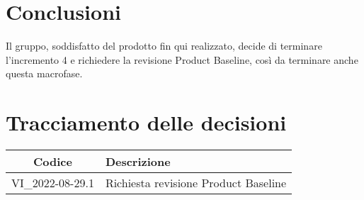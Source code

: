 \section{Conclusioni}
Il gruppo, soddisfatto del prodotto fin qui realizzato, decide di terminare l'incremento 4 e richiedere la revisione Product Baseline, così da terminare anche questa macrofase.
\newpage

\section*{Tracciamento delle decisioni}
	\renewcommand{\arraystretch}{1.8} %
	\begin{tabular}{ |c|l| }
		\hline
		\textbf{Codice} & \textbf{Descrizione} \\
		\hline
		VI\_2022-08-29.1 & Richiesta revisione Product Baseline\\ %
		\hline
	\end{tabular}